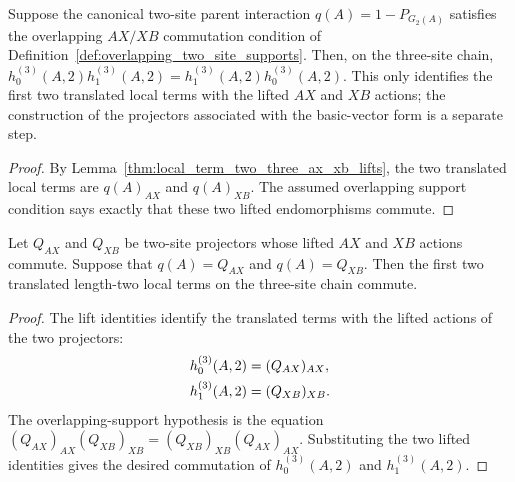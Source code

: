 \begin{lemma}
    \label{thm:local_term_two_three_commute_from_ax_xb}
    \leanok
    Suppose the canonical two-site parent interaction $q(A)=1-P_{G_2(A)}$
    satisfies the overlapping $AX/XB$ commutation condition of
    Definition~\ref{def:overlapping_two_site_supports}. Then, on the three-site
    chain,
    $h^{(3)}_0(A,2)h^{(3)}_1(A,2) = h^{(3)}_1(A,2)h^{(3)}_0(A,2)$.
    This only identifies the first two translated local terms with the lifted
    $AX$ and $XB$ actions; the construction of the
    \cite[Appendix~D.2]{Cirac2016MPDO_arXiv} projectors associated with the
    \cite[Appendix~B]{Cirac2016MPDO_arXiv} basic-vector form is a separate step.
\end{lemma}

\begin{proof}\leanok
    By Lemma~\ref{thm:local_term_two_three_ax_xb_lifts}, the two translated
    local terms are $q(A)_{AX}$ and $q(A)_{XB}$. The assumed overlapping
    support condition says exactly that these two lifted endomorphisms commute.
\end{proof}

\begin{lemma}
    \label{thm:local_term_two_three_commute_from_two_site_q}
    \leanok
    Let $Q_{AX}$ and $Q_{XB}$ be two-site projectors whose lifted $AX$ and
    $XB$ actions commute. Suppose that $q(A)=Q_{AX}$ and $q(A)=Q_{XB}$.
    Then the first two translated length-two local terms on the three-site
    chain commute.
\end{lemma}

\begin{proof}\leanok
    The lift identities identify the translated terms with the lifted actions
    of the two projectors:
    \begin{align}
        h^{(3)}_0(A,2) & =(Q_{AX})_{AX},
        \notag                           \\
        h^{(3)}_1(A,2) & =(Q_{XB})_{XB}.
        \notag
    \end{align}
    The overlapping-support hypothesis is the equation
    $(Q_{AX})_{AX}(Q_{XB})_{XB} = (Q_{XB})_{XB}(Q_{AX})_{AX}$.
    Substituting the two lifted identities gives the desired commutation of
    $h^{(3)}_0(A,2)$ and $h^{(3)}_1(A,2)$.
\end{proof}

